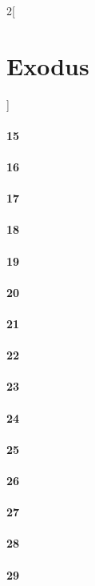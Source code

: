 \documentclass{book}
\begin{document}
\begin{multicols}{2}[\part{Exodus}]
\subsection*{15}
\subsection*{16}
\subsection*{17}
\subsection*{18}
\subsection*{19}
\subsection*{20}
\subsection*{21}
\subsection*{22}
\subsection*{23}
\subsection*{24}
\subsection*{25}
\subsection*{26}
\subsection*{27}
\subsection*{28}
\subsection*{29}

\end{multicols}
\end{document}
